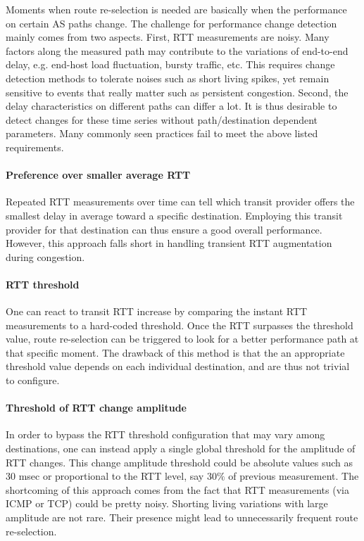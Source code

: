 Moments when route re-selection is needed are basically when the performance on certain AS paths change.
The challenge for performance change detection mainly comes from two aspects.
First, RTT measurements are noisy.
Many factors along the measured path may contribute to the variations of end-to-end delay, e.g. end-host load fluctuation, bursty traffic, etc.
This requires change detection methods to tolerate noises such as short living spikes, yet remain sensitive to events that really matter such as persistent congestion.
Second, the delay characteristics on different paths can differ a lot. 
It is thus desirable to detect changes for these time series without path/destination dependent parameters.
Many commonly seen practices fail to meet the above listed requirements. 

\paragraph{Preference over smaller average RTT} Repeated RTT measurements over time can tell which transit provider offers the smallest delay in average toward a specific destination. 
Employing this transit provider for that destination can thus ensure a good overall performance. 
However, this approach falls short in handling transient RTT augmentation during congestion.

\paragraph{RTT threshold} One can react to transit RTT increase by comparing the instant RTT measurements to a hard-coded threshold. 
Once the RTT surpasses the threshold value, route re-selection can be triggered to look for a better performance path at that specific moment.
The drawback of this method is that the an appropriate threshold value depends on each individual destination, and are thus not trivial to configure.

\paragraph{Threshold of RTT change amplitude} In order to bypass the RTT threshold configuration that may vary among destinations, one can instead apply a single global threshold for the amplitude of RTT changes.
This change amplitude threshold could be absolute values such as 30 msec or proportional to the RTT level, say $30\%$ of previous measurement.
The shortcoming of this approach comes from the fact that RTT measurements (via ICMP or TCP) could be pretty noisy.
Shorting living variations with large amplitude are not rare.
Their presence might lead to unnecessarily frequent route re-selection.

